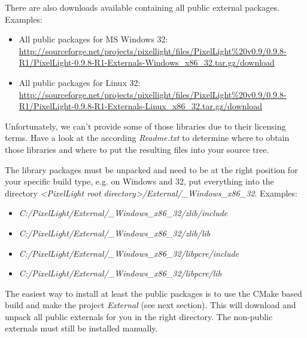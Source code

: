 There are also downloads available containing all public external packages. Examples:
\begin{itemize}
\item{All public packages for MS Windows \SI{32}{\bit}: \url{http://sourceforge.net/projects/pixellight/files/PixelLight%20v0.9/0.9.8-R1/PixelLight-0.9.8-R1-Externals-Windows_x86_32.tar.gz/download}}
\item{All public packages for Linux \SI{32}{\bit}: \url{http://sourceforge.net/projects/pixellight/files/PixelLight%20v0.9/0.9.8-R1/PixelLight-0.9.8-R1-Externals-Linux_x86_32.tar.gz/download}}
\end{itemize}

Unfortunately, we can't provide some of those libraries due to their licensing terms. Have a look at the according \emph{Readme.txt} to determine where to obtain those libraries and where to put the resulting files into your source tree.

The library packages must be unpacked and need to be at the right position for your specific build type, e.g. on Windows and \SI{32}{\bit}, put everything into the directory \emph{\textless PixelLight root directory\textgreater /External/\_Windows\_x86\_32}. Examples:
\begin{itemize}
\item{\emph{C:/PixelLight/External/\_Windows\_x86\_32/zlib/include}}
\item{\emph{C:/PixelLight/External/\_Windows\_x86\_32/zlib/lib}}
\item{\emph{C:/PixelLight/External/\_Windows\_x86\_32/libpcre/include}}
\item{\emph{C:/PixelLight/External/\_Windows\_x86\_32/libpcre/lib}}
\end{itemize}

The easiest way to install at least the public packages is to use the CMake based build and make the project \emph{External} (see next section). This will download and unpack all public externals for you in the right directory. The non-public externals must still be installed manually.
